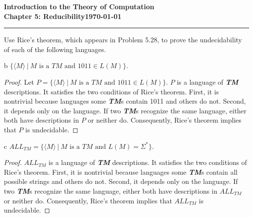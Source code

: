 \documentclass[11pt]{article}
\newcommand{\dated}{\today}
\begin{document}
\textbf{Introduction to the Theory of
Computation}\hfill\textbf{\myname}\\[0.01in]
\textbf{Chapter 5: Reducibility}\hfill\textbf{\dated}\\
\smallskip\hrule\bigskip

\begin{problem}{5.26}
Use Rice’s theorem, which appears in Problem 5.28, to prove the undecidability of each of the following languages.
\end{problem}

\begin{problem}[Part]{b}
$\{\langle M \rangle \ | \ M \text{ is a } TM \text{ and } 1011 \in L(M)\}$.
\end{problem}

\begin{proof}
Let $P = \{\langle M \rangle \ | \ M \text{ is a } TM \text{ and } 1011 \in L(M)\}$. $P$ is a language of \textbf{\textit{TM}} descriptions. It satisfies the two conditions of Rice’s theorem. First, it is nontrivial because languages some \textbf{\textit{TM}}s contain 1011 and others do not. Second, it depends only on the language. If two \textbf{\textit{TM}}s recognize the same language, either both have descriptions in $P$ or neither do. Consequently, Rice’s theorem implies that $P$ is undecidable.
\end{proof}

\begin{problem}[Part]{c}
$ALL_{TM} = \{\langle M \rangle \ | \ M \text{ is a } TM \text{ and } L(M ) = \Sigma^{*}\}$.
\end{problem}

\begin{proof}
$ALL_{TM}$ is a language of \textbf{\textit{TM}} descriptions. It satisfies the two conditions of Rice’s theorem. First, it is nontrivial because languages some \textbf{\textit{TM}}s contain all possible strings and others do not. Second, it depends only on the language. If two \textbf{\textit{TM}}s recognize the same language, either both have descriptions in $ALL_{TM}$ or neither do. Consequently, Rice’s theorem implies that $ALL_{TM}$ is undecidable.
\end{proof}
\end{document}
